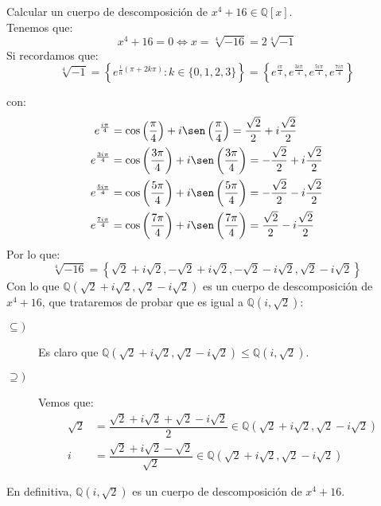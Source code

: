 \begin{ejercicio}
    Calcular un cuerpo de descomposición de $x^4+16\in \mathbb{Q}[x]$.\\

    \noindent
    Tenemos que:
    \begin{equation*}
        x^4+16= 0 \Longleftrightarrow x=\sqrt[4]{-16} = 2\sqrt[4]{-1}
    \end{equation*}
    Si recordamos que:
    \begin{equation*}
        \sqrt[4]{-1} = \left\{e^{\frac{i}{n}(\pi + 2k\pi)} : k\in \{0,1,2,3\}\right\} = \left\{e^{\frac{i\pi}{4}}, e^{\frac{3i\pi}{4}}, e^{\frac{5i\pi}{4}}, e^{\frac{7i\pi}{4}}\right\}
    \end{equation*}

    con:
    \begin{align*}
        e^{\frac{i\pi}{4}} &= \cos\left(\frac{\pi}{4}\right) + i\sen\left(\frac{\pi}{4}\right) = \frac{\sqrt{2}}{2} + i\frac{\sqrt{2}}{2} \\
        e^\frac{3i\pi}{4} &= \cos\left(\frac{3\pi}{4}\right) + i\sen\left(\frac{3\pi}{4}\right) = -\frac{\sqrt{2}}{2} + i\frac{\sqrt{2}}{2} \\
        e^\frac{5i\pi}{4} &= \cos\left(\frac{5\pi}{4}\right) + i\sen\left(\frac{5\pi}{4}\right) = -\frac{\sqrt{2}}{2} - i\frac{\sqrt{2}}{2} \\
        e^\frac{7i\pi}{4} &= \cos\left(\frac{7\pi}{4}\right) + i\sen\left(\frac{7\pi}{4}\right) = \frac{\sqrt{2}}{2} - i\frac{\sqrt{2}}{2} 
    \end{align*}
    Por lo que:
    \begin{equation*}
        \sqrt[4]{-16} = \left\{\sqrt{2}+i\sqrt{2}, -\sqrt{2}+i\sqrt{2}, -\sqrt{2}-i\sqrt{2},\sqrt{2}-i\sqrt{2}\right\}
    \end{equation*}
    Con lo que $\mathbb{Q}\left(\sqrt{2}+i\sqrt{2}, \sqrt{2}-i\sqrt{2}\right)$ es un cuerpo de descomposición de $x^4+16$, que trataremos de probar que es igual a $\mathbb{Q}\left(i,\sqrt{2}\right)$:
    \begin{description}
        \item [$\subseteq )$] Es claro que $\mathbb{Q}\left(\sqrt{2}+i\sqrt{2}, \sqrt{2}-i\sqrt{2}\right)\leq \mathbb{Q}\left(i,\sqrt{2}\right)$.
        \item [$\supseteq )$] Vemos que:
            \begin{align*}
                \sqrt{2} &= \dfrac{\sqrt{2}+i\sqrt{2}+\sqrt{2}-i\sqrt{2}}{2} \in \mathbb{Q}\left(\sqrt{2}+i\sqrt{2}, \sqrt{2}-i\sqrt{2}\right) \\
                i &= \dfrac{\sqrt{2}+i\sqrt{2}-\sqrt{2}}{\sqrt{2}} \in  \mathbb{Q}\left(\sqrt{2}+i\sqrt{2}, \sqrt{2}-i\sqrt{2}\right)
            \end{align*}
    \end{description}
    En definitiva, $\mathbb{Q}\left(i,\sqrt{2}\right)$ es un cuerpo de descomposición de $x^4+16$.
\end{ejercicio}

